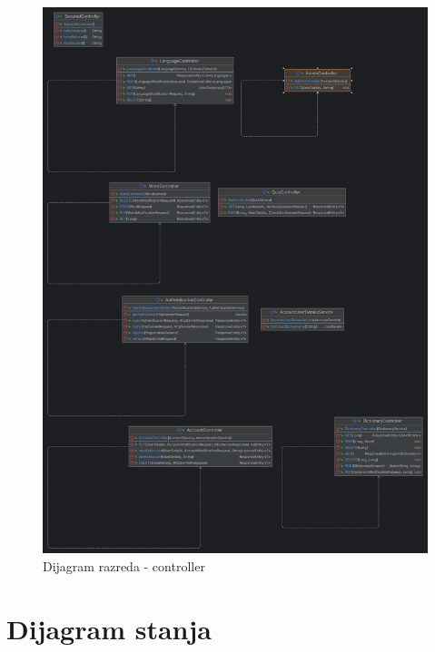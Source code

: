 			\begin{figure}[H]
				\includegraphics[width=\textwidth]{slike/ClassDiagram4.PNG}
				\caption{Dijagram razreda - controller}
				\label{fig:classDiagram4}
			\end{figure}
			
			\newpage
			
			
			
			\newpage
			
			
			
			
			
			\eject
		
		\section{Dijagram stanja}
			

